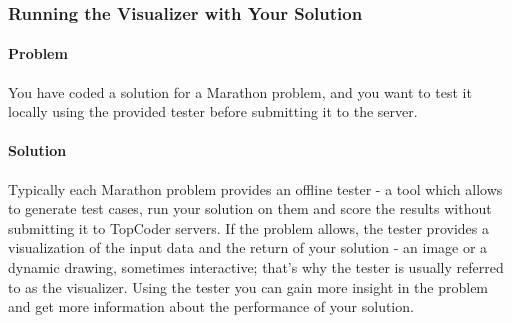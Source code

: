 \begin{Shaded}
\begin{Highlighting}[]

     

    \NormalTok{ (}\NormalTok{ : }






\NormalTok{\}}
\end{Highlighting}
\end{Shaded}

\hypertarget{running-the-visualizer-with-your-solution}{%
\subsubsection{Running the Visualizer with Your
Solution}\label{running-the-visualizer-with-your-solution}}

\hypertarget{problem-1}{%
\paragraph{Problem}\label{problem-1}}

You have coded a solution for a Marathon problem, and you want to test
it locally using the provided tester before submitting it to the server.

\hypertarget{solution-1}{%
\paragraph{Solution}\label{solution-1}}

Typically each Marathon problem provides an offline tester - a tool
which allows to generate test cases, run your solution on them and score
the results without submitting it to TopCoder servers. If the problem
allows, the tester provides a visualization of the input data and the
return of your solution - an image or a dynamic drawing, sometimes
interactive; that's why the tester is usually referred to as the
visualizer. Using the tester you can gain more insight in the problem
and get more information about the performance of your solution.

